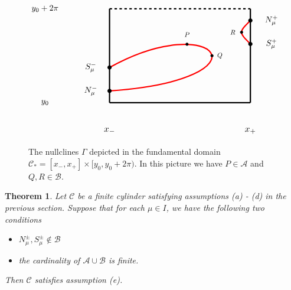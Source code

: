 \documentclass[11 pt]{article}
\newtheorem{thm}{Theorem}[section]
\renewcommand\({\left(}
\renewcommand\){\right)}
\newcommand\<{\langle}
\renewcommand\>{\rangle}
\newcommand\8{\infty}
\newcommand{\mc}{\mathcal}
\begin{document}
 
 \begin{figure}[h]
\[
\begin{tikzpicture}[scale = 1.0]


\draw[ultra thick] (-3,-2) -- (-3, 2);
\draw[ultra thick] (3,-2) -- (3,2);
\draw[ultra thick] (-3,-2) -- (3,-2);
\draw[ultra thick, dashed] (-3,2) -- (3,2);


\draw (-3, -3.2) node [scale = 1.10] {$x_-$};
\draw (3, -3.2) node [scale = 1.10] {$x_+$};

\draw (-5.75,-2) node [scale =1.0] {$y_0$};
\draw (-5.75,2) node [scale =1.0] {$y_0 + 2\pi$};



\draw[ultra thick, red] (-3,-.5) .. controls (1.5,2) and (4,-1) .. (-3,-1.5);
\draw[ultra thick, red] (3,.5) .. controls (2.5, 1) .. (3, 1.5);



\node [scale = .35] [circle, draw, fill = black] at (2.625,1) {};
\node [scale = .35] [circle, draw, fill = black] at (1.365,0) {};
\node [scale = .35] [circle, draw, fill = black] at (.3,.49) {};


\draw (2.25,1) node [scale =.8] {$R$};
\draw (1.7,0) node [scale =.8] {$Q$};
\draw (.3,.9) node [scale =.8] {$P$};



\node [scale = .50] [circle, draw, fill = black] at (-3,-1.5)  {};
\node [scale = .50] [circle, draw, fill = black] at (-3,-.5)  {};
\node [scale = .50] [circle, draw, fill = black] at (3,1.5)  {};
\node [scale = .50] [circle, draw, fill = black] at (3,.5)  {};

\draw (-3.8,-.5) node [scale =1.0] {$S^-_\mu$};
\draw (-3.8,-1.5) node [scale =1.0] {$N^-_\mu$};
\draw (3.9,1.5) node [scale =1.0] {$N^+_\mu$};
\draw (3.9,.5) node [scale =1.0] {$S^+_\mu$};


\end{tikzpicture}
\]
\captionsetup{format=hang}
\caption{\small{The nullclines $\Gamma$ depicted in the fundamental domain $\mc{C}_* = [x_-, x_+] \times [y_0, y_0 + 2\pi)$. In this picture we have $P \in \mc{A}$ and $Q,R \in \mc{B}$.}}
\end{figure}
 
 \medskip
 \medskip
 
 \begin{thm}\label{verification of (e) thm}
 Let $\mc{C}$ be a finite cylinder satisfying assumptions \emph{(a) - (d)} in the previous section. Suppose that for each $\mu \in I$, we have the following two conditions
 \begin{itemize}
 \item[\emph{(1)}] $N^\pm_\mu, S^\pm_\mu \notin \mc{B}$ 
 
 \item[\emph{(2)}] the cardinality of $\mc{A} \cup \mc{B}$ is finite.
 \end{itemize}
 Then $\mc{C}$ satisfies assumption \emph{(e)}. 
 \end{thm}
\end{document}
